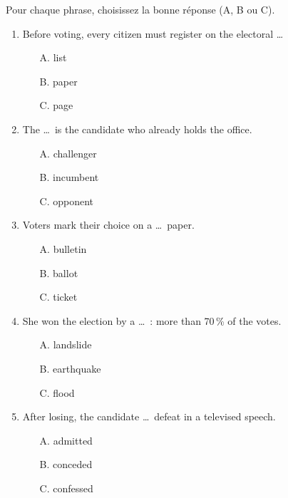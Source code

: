 \documentclass[11pt]{article}
\newcommand{\cle}[1]{{\popxbold\color{popdark}#1}}
\begin{document}
\begin{exercice}
Pour chaque phrase, choisissez la bonne réponse (A, B ou C).
\begin{enumerate}
\item Before voting, every citizen must \cle{register} on the electoral \ldots\ 
\begin{itemize}
\item[A.] list \item[B.] paper \item[C.] page
\end{itemize}
\item The \ldots\ is the candidate who already holds the office.
\begin{itemize}
\item[A.] challenger \item[B.] incumbent \item[C.] opponent
\end{itemize}
\item Voters mark their choice on a \ldots\ paper.
\begin{itemize}
\item[A.] bulletin \item[B.] ballot \item[C.] ticket
\end{itemize}
\item She won the election by a \ldots\ : more than 70\,\% of the votes.
\begin{itemize}
\item[A.] landslide \item[B.] earthquake \item[C.] flood
\end{itemize}
\item After losing, the candidate \ldots\ defeat in a televised speech.
\begin{itemize}
\item[A.] admitted \item[B.] conceded \item[C.] confessed
\end{itemize}
\end{enumerate}
\end{exercice}
\end{document}
